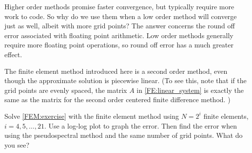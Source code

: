 \begin{problem}
	Higher order methods promise faster convergence, but typically require more work to code. So why do we use them when a low order method will converge just as well, albeit with more grid points? The answer concerns the round off error associated with floating point arithmetic. Low order methods generally require more floating point operations, so round off error has a much greater effect. 
	
The finite element method introduced here is a second order method, even though the approximate solution is piecewise linear. (To see this, note that if the grid points are evenly spaced, the matrix $A$ in \eqref{FE:linear_system} is exactly the same as the matrix for the second order centered finite difference method. )

Solve \eqref{FEM:exercise} with the finite element method using $N = 2^i$  finite elements, $i = 4, 5, \ldots, 21$. Use a log-log plot to graph the error. Then find the error when using the pseudospectral method and the same number of grid points. What do you see? 
\end{problem}
% 




